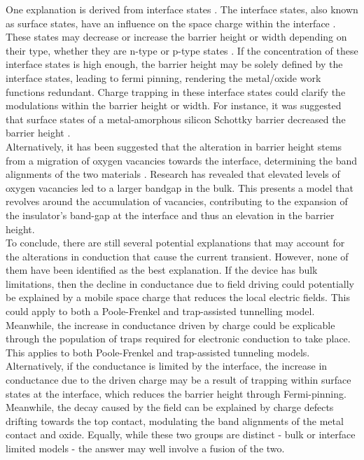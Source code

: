 \noindent One explanation is derived from interface states \cite{seong2007hpha}. The interface states, also known as surface states, have an influence on the space charge within the interface \cite{bardeen1947surface}. These states may decrease or increase the barrier height or width depending on their type, whether they are n-type or p-type states \cite{cowley1965surface}. If the concentration of these interface states is high enough, the barrier height may be solely defined by the interface states, leading to fermi pinning, rendering the metal/oxide work functions redundant. Charge trapping in these interface states could clarify the modulations within the barrier height or width. For instance, it was suggested that surface states of a metal-amorphous silicon Schottky barrier decreased the barrier height \cite{wronski1977surface}.\\

\noindent Alternatively, it has been suggested that the alteration in barrier height stems from a migration of oxygen vacancies towards the interface, determining the band alignments of the two materials \cite{asanuma2009relationship}. Research has revealed that elevated levels of oxygen vacancies led to a larger bandgap in the bulk. This presents a model that revolves around the accumulation of vacancies, contributing to the expansion of the insulator's band-gap at the interface and thus an elevation in the barrier height.\\

\noindent To conclude, there are still several potential explanations that may account for the alterations in conduction that cause the current transient. However, none of them have been identified as the best explanation. If the device has bulk limitations, then the decline in conductance due to field driving could potentially be explained by a mobile space charge that reduces the local electric fields. This could apply to both a Poole-Frenkel and trap-assisted tunnelling model. Meanwhile, the increase in conductance driven by charge could be explicable through the population of traps required for electronic conduction to take place.\\

\noindent This applies to both Poole-Frenkel and trap-assisted tunneling models. Alternatively, if the conductance is limited by the interface, the increase in conductance due to the driven charge may be a result of trapping within surface states at the interface, which reduces the barrier height through Fermi-pinning. Meanwhile, the decay caused by the field can be explained by charge defects drifting towards the top contact, modulating the band alignments of the metal contact and oxide. Equally, while these two groups are distinct - bulk or interface limited models - the answer may well involve a fusion of the two.\\

